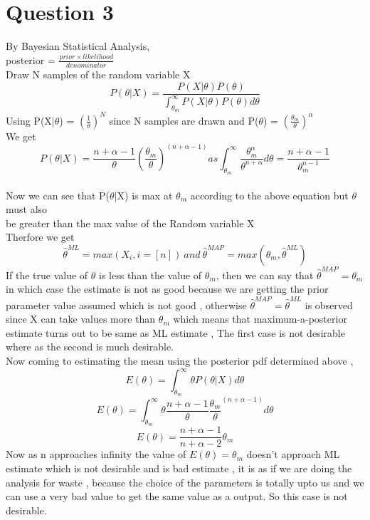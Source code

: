 \documentclass{article}
\begin{document}
\section*{Question 3}
By Bayesian Statistical Analysis,\\
posterior = $\frac{prior \times likelihood}{denominator}$\\
Draw N samples of the random variable X
\begin{equation*}
    P(\theta | X) = \frac{P(X|\theta) P(\theta)}{\int_{\theta_m}^\infty P(X|\theta)P(\theta) d\theta}
\end{equation*}
Using P(X|$\theta$) = $(\frac{1}{\theta})^N$ since N samples are drawn and P($\theta$) = $(\frac{\theta_m}{\theta})^\alpha$\\
We get\\
\begin{equation*}
    P(\theta|X) = \frac{n+\alpha-1}{\theta}{(\frac{\theta_m}{\theta})}^{(n+\alpha-1)} as 
\int_{\theta_m}^{\infty} \frac{\theta_m^\alpha}{\theta^{n+\alpha}}d\theta = \frac{n+\alpha -1}{\theta_m^{n-1}}
\end{equation*}
\\
Now we can see that P($\theta$|X) is max at $\theta_m$ according to the above equation but $\theta$ must also \\be greater than the max value of the Random variable X\\
Therfore we get 
\begin{equation*}
    \hat{\theta}^{ML} = max(X_i, i = [n]) \  and \  \hat{\theta}^{MAP} = max( \theta_m,\hat{\theta}^{ML})
\end{equation*}
If the true value of $\theta$ is less than the value of $\theta_m$, then we can say that $\hat{\theta}^{MAP} = \theta_m$ in which case the estimate is not as good because we are getting the prior parameter value assumed which is not good , otherwise $\hat{\theta}^{MAP} = \hat{\theta}^{ML}$ is observed since X can take values more than $\theta_m$ which means that maximum-a-posterior estimate turns out to be same as ML estimate , The first case is not desirable where as the second is much desirable.\\
Now coming to estimating the mean using the posterior pdf determined above ,\\
\begin{equation*}
    E(\theta) = \int_{\theta_m}^{\infty} \theta P(\theta|X) d\theta
\end{equation*}
\begin{equation*}
    E(\theta) = \int_{\theta_m}^{\infty} \theta \frac{n+\alpha-1}{\theta}{\frac{\theta_m}{\theta}}^{(n+\alpha-1)} d\theta
\end{equation*}
\begin{equation*}
    E(\theta) = \frac{n+\alpha-1}{n+\alpha-2} \theta_m
\end{equation*}
Now as n approaches infinity the value of $E(\theta) = \theta_m$ doesn't approach ML estimate which is not desirable and is bad estimate , it is as if we are doing the analysis for waste , because the choice of the parameters is totally upto us and we can use a very bad value to get the same value as a output. So this case is not desirable.
\end{document}
